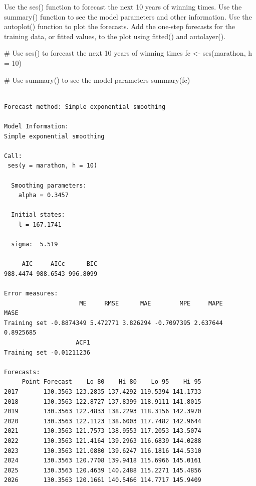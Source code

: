 \documentclass[
  letterpaper,
  DIV=11,
  numbers=noendperiod]{scrartcl}
\newenvironment{Shaded}{\begin{snugshade}}{\end{snugshade}}
\newcommand{\AttributeTok}[1]{\textcolor[rgb]{0.40,0.45,0.13}{#1}}
\newcommand{\CommentTok}[1]{\textcolor[rgb]{0.37,0.37,0.37}{#1}}
\newcommand{\DecValTok}[1]{\textcolor[rgb]{0.68,0.00,0.00}{#1}}
\newcommand{\FunctionTok}[1]{\textcolor[rgb]{0.28,0.35,0.67}{#1}}
\newcommand{\NormalTok}[1]{\textcolor[rgb]{0.00,0.23,0.31}{#1}}
\newcommand{\OtherTok}[1]{\textcolor[rgb]{0.00,0.23,0.31}{#1}}
\begin{document}
Use the ses() function to forecast the next 10 years of winning times.
Use the summary() function to see the model parameters and other
information. Use the autoplot() function to plot the forecasts. Add the
one-step forecasts for the training data, or fitted values, to the plot
using fitted() and autolayer().

\begin{Shaded}
\begin{Highlighting}[]
\CommentTok{\# Use ses() to forecast the next 10 years of winning times}
\NormalTok{fc }\OtherTok{\textless{}{-}} \FunctionTok{ses}\NormalTok{(marathon, }\AttributeTok{h =} \DecValTok{10}\NormalTok{)}

\CommentTok{\# Use summary() to see the model parameters}
\FunctionTok{summary}\NormalTok{(fc)}
\end{Highlighting}
\end{Shaded}

\begin{verbatim}

Forecast method: Simple exponential smoothing

Model Information:
Simple exponential smoothing 

Call:
 ses(y = marathon, h = 10) 

  Smoothing parameters:
    alpha = 0.3457 

  Initial states:
    l = 167.1741 

  sigma:  5.519

     AIC     AICc      BIC 
988.4474 988.6543 996.8099 

Error measures:
                     ME     RMSE      MAE        MPE     MAPE      MASE
Training set -0.8874349 5.472771 3.826294 -0.7097395 2.637644 0.8925685
                    ACF1
Training set -0.01211236

Forecasts:
     Point Forecast    Lo 80    Hi 80    Lo 95    Hi 95
2017       130.3563 123.2835 137.4292 119.5394 141.1733
2018       130.3563 122.8727 137.8399 118.9111 141.8015
2019       130.3563 122.4833 138.2293 118.3156 142.3970
2020       130.3563 122.1123 138.6003 117.7482 142.9644
2021       130.3563 121.7573 138.9553 117.2053 143.5074
2022       130.3563 121.4164 139.2963 116.6839 144.0288
2023       130.3563 121.0880 139.6247 116.1816 144.5310
2024       130.3563 120.7708 139.9418 115.6966 145.0161
2025       130.3563 120.4639 140.2488 115.2271 145.4856
2026       130.3563 120.1661 140.5466 114.7717 145.9409
\end{verbatim}
\end{document}
